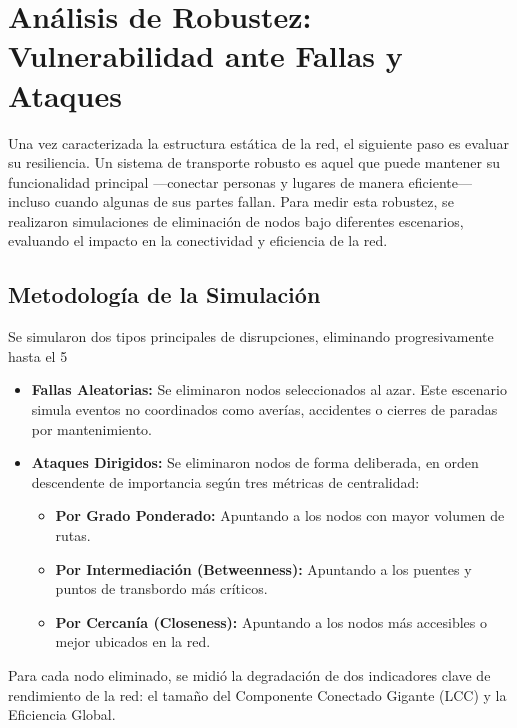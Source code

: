     \section{Análisis de Robustez: Vulnerabilidad ante Fallas y Ataques}

        Una vez caracterizada la estructura estática de la red, el siguiente paso es evaluar su resiliencia. Un sistema de transporte robusto es aquel que puede mantener su funcionalidad principal —conectar personas y lugares de manera eficiente— incluso cuando algunas de sus partes fallan. Para medir esta robustez, se realizaron simulaciones de eliminación de nodos bajo diferentes escenarios, evaluando el impacto en la conectividad y eficiencia de la red.

        \subsection{Metodología de la Simulación}

        Se simularon dos tipos principales de disrupciones, eliminando progresivamente hasta el 5%

        \begin{itemize}
            \item \textbf{Fallas Aleatorias:} Se eliminaron nodos seleccionados al azar. Este escenario simula eventos no coordinados como averías, accidentes o cierres de paradas por mantenimiento.
            \item \textbf{Ataques Dirigidos:} Se eliminaron nodos de forma deliberada, en orden descendente de importancia según tres métricas de centralidad:
            \begin{itemize}
                \item \textbf{Por Grado Ponderado:} Apuntando a los nodos con mayor volumen de rutas.
                \item \textbf{Por Intermediación (Betweenness):} Apuntando a los puentes y puntos de transbordo más críticos.
                \item \textbf{Por Cercanía (Closeness):} Apuntando a los nodos más accesibles o mejor ubicados en la red.
            \end{itemize}
        \end{itemize}

        Para cada nodo eliminado, se midió la degradación de dos indicadores clave de rendimiento de la red: el tamaño del Componente Conectado Gigante (LCC) y la Eficiencia Global.

